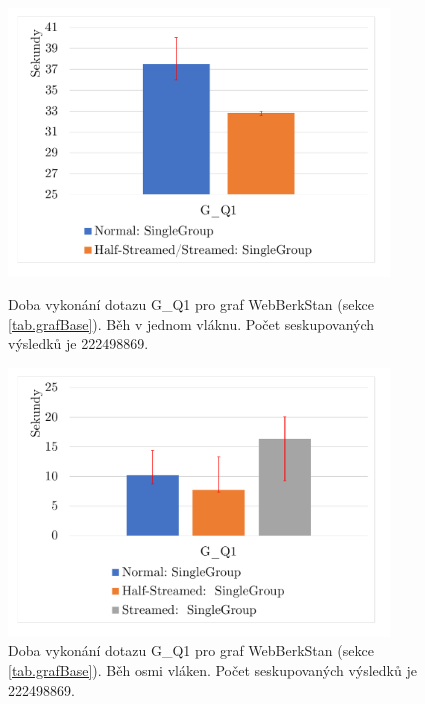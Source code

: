 \begin{figure}[!htp]
    \centering
    \begin{minipage}{0.45\textwidth}
        \centering
        \includegraphics[width=0.9\textwidth]{../img/webberkstanGroupByQ1ST.pdf} %
        \caption{Doba vykonání dotazu G\_Q1 pro graf WebBerkStan (sekce \ref{tab.grafBase}). Běh v jednom vláknu. Počet seskupovaných výsledků je 222498869.}
        \label{figure.webberkstanGQ1ST}
    \end{minipage}\hfill
    \begin{minipage}{0.45\textwidth}
        \centering
        \includegraphics[width=0.9\textwidth]{../img/webberkstanGroupByQ1Par.pdf} %
        \caption{Doba vykonání dotazu G\_Q1 pro graf WebBerkStan (sekce \ref{tab.grafBase}). Běh osmi vláken. Počet seskupovaných výsledků je 222498869.}
        \label{figure.webberkstanGQ1Par}
    \end{minipage}
\end{figure}

